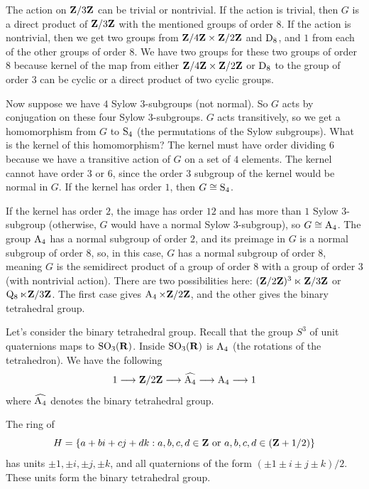 \documentclass[11pt, oneside]{amsart}
\begin{document}
The action on $\mathbf Z / 3\mathbf Z$ can be trivial or nontrivial. If the action is trivial, then $G$ is a direct product of $\mathbf Z / 3\mathbf Z$ with the mentioned groups of order $8$. If the action is nontrivial, then we get two groups from $\mathbf Z / 4\mathbf Z\times \mathbf Z / 2\mathbf Z$ and $\operatorname{D}_8$, and $1$ from each of the other groups of order $8$. We have two groups for these two groups of order $8$ because kernel of the map from either $\mathbf Z / 4\mathbf Z\times \mathbf Z / 2\mathbf Z$ or $\operatorname{D}_8$ to the group of order $3$ can be cyclic or a direct product of two cyclic groups.

Now suppose we have $4$ Sylow $3$-subgroups (not normal). So $G$ acts by conjugation on these four Sylow $3$-subgroups.  $G$ acts transitively, so we get a homomorphism from $G$ to $\operatorname{S}_4$ (the permutations of the Sylow subgroups). What is the kernel of this homomorphism? The kernel must have order dividing $6$ because we have a transitive action of $G$ on a set of $4$ elements. The kernel cannot have order $3$ or $6$, since the order $3$ subgroup of the kernel would be normal in $G$. If the kernel has order $1$, then $G\cong\operatorname{S}_4$. 

If the kernel has order $2$, the image has order $12$ and has more than $1$ Sylow $3$-subgroup (otherwise, $G$ would have a normal Sylow $3$-subgroup), so $G\cong \operatorname{A}_4$. The group $\operatorname{A}_4$ has a normal subgroup of order $2$, and its preimage in $G$ is a normal subgroup of order $8$, so, in this case, $G$ has a normal subgroup of order $8$, meaning $G$ is the semidirect product of a group of order $8$ with a group of order $3$ (with nontrivial action). There are two possibilities here: $(\mathbf Z / 2\mathbf Z)^3\ltimes \mathbf Z / 3\mathbf Z$ or $\operatorname{Q_8} \ltimes \mathbf Z / 3\mathbf Z$. The first case gives $\operatorname{A}_4 \times \mathbf Z / 2\mathbf Z$, and the other gives the binary tetrahedral group.

Let's consider the binary tetrahedral group. Recall that the group $S^3$ of unit quaternions maps to $\operatorname{SO}_3(\mathbf R)$. Inside $\operatorname{SO}_3(\mathbf R)$ is $\operatorname{A}_4$ (the rotations of the tetrahedron). We have the following 
$$
1 \longrightarrow \mathbf Z / 2\mathbf Z \longrightarrow \widehat{\operatorname{A}_4} \longrightarrow \operatorname{A}_4 \longrightarrow 1 
$$
where $\widehat{\operatorname{A}_4}$ denotes the binary tetrahedral group. 

The ring of 
$$
H = \{ a+ bi + cj + dk : a,b,c,d \in \mathbf Z \textrm{ or } a,b,c,d \in (\mathbf Z + 1/2)\} 
$$
has units $\pm 1,\pm i ,\pm j, \pm k$, and all quaternions of the form $(\pm 1 \pm i \pm j \pm k)/2$. These units form the binary tetrahedral group.
\end{document}
